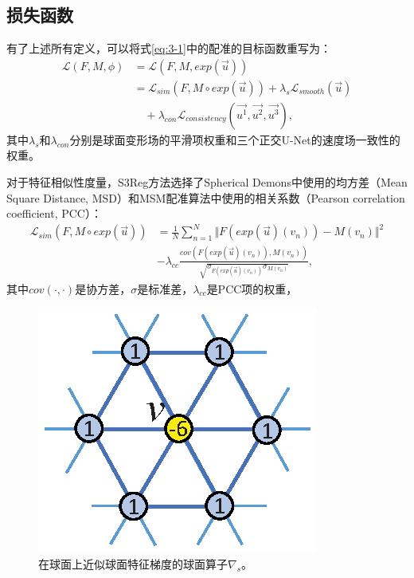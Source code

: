 \subsection{损失函数}\label{sec:s3reg配准网络的损失函数}
有了上述所有定义，可以将式\ref{eq:3-1}中的配准的目标函数重写为：
\begin{equation}
\begin{split}
{\mathcal{L}}(F,M,\phi) & = {\mathcal{L}}(F,M,exp(\overrightarrow{u})) \\
& = {\mathcal{L}}_{sim}(F,M\circ exp(\overrightarrow{u})) + \lambda_s {\mathcal{L}}_{smooth}(\overrightarrow{u}) \\
& \quad + \lambda_{con} {\mathcal{L}}_{consistency}(\overrightarrow{u^1}, \overrightarrow{u^2}, \overrightarrow{u^3}),
\end{split}
\end{equation}
其中$\lambda_s$和$\lambda_{con}$分别是球面变形场的平滑项权重和三个正交U-Net的速度场一致性的权重。

对于特征相似性度量，S3Reg方法选择了Spherical Demons中使用的均方差（Mean Square Distance, MSD）\cite{yeo2009spherical}和MSM配准算法\cite{robinson2014msm}中使用的相关系数（Pearson correlation coefficient, PCC）：
\begin{equation}
	\begin{split}
	{\mathcal{L}}_{sim}(F,M\circ exp(\overrightarrow{u})) & = \frac{1}{N} \sum_{n=1}^{N} \Vert F(exp(\overrightarrow{u})(v_n)) - M(v_n) \Vert ^2 \\
	& - \lambda_{cc} \frac{cov(F(exp(\overrightarrow{u})(v_n)), M(v_n))}{\sqrt{\sigma_{ F(exp(\overrightarrow{u})(v_n))} \sigma_{M(v_n)}}} , 
	\end{split}
\end{equation}
其中$cov(\cdot,\cdot)$是协方差，$\sigma$是标准差，$\lambda_{cc}$是PCC项的权重，

\begin{figure}[t]
	\centering
	\includegraphics[width=0.35\columnwidth]{figure/gradient_kernel.eps}
	\caption{在球面上近似球面特征梯度的球面算子$\nabla_s$。}
	\label{fig:gradient_kernel}
\end{figure}

